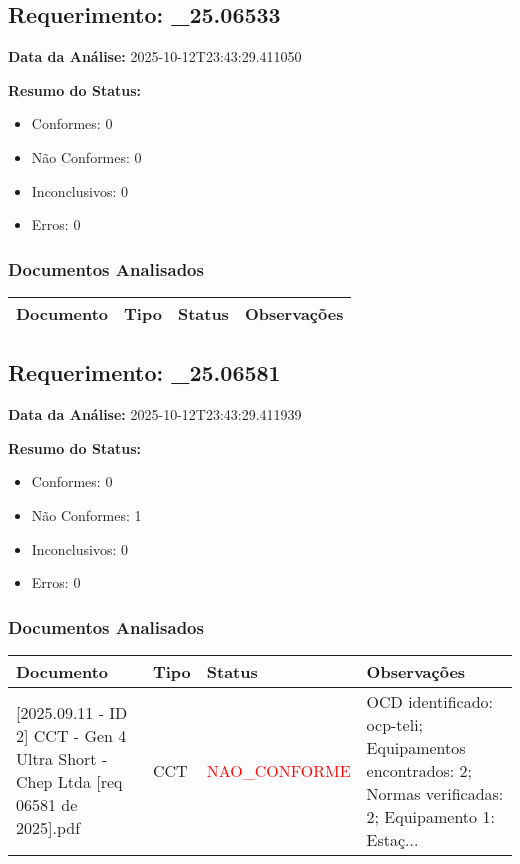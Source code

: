 \documentclass[12pt,a4paper]{article}
\begin{document}
\subsection{Requerimento: \_25.06533}

\textbf{Data da Análise:} 2025-10-12T23:43:29.411050

\textbf{Resumo do Status:}
\begin{itemize}
    \item Conformes: 0
    \item Não Conformes: 0
    \item Inconclusivos: 0
    \item Erros: 0
\end{itemize}

\subsubsection{Documentos Analisados}

\begin{longtable}{|p{4cm}|p{2cm}|p{2cm}|p{6cm}|}
\hline
\textbf{Documento} & \textbf{Tipo} & \textbf{Status} & \textbf{Observações} \\
\hline
\endhead
\end{longtable}


\subsection{Requerimento: \_25.06581}

\textbf{Data da Análise:} 2025-10-12T23:43:29.411939

\textbf{Resumo do Status:}
\begin{itemize}
    \item Conformes: 0
    \item Não Conformes: 1
    \item Inconclusivos: 0
    \item Erros: 0
\end{itemize}

\subsubsection{Documentos Analisados}

\begin{longtable}{|p{4cm}|p{2cm}|p{2cm}|p{6cm}|}
\hline
\textbf{Documento} & \textbf{Tipo} & \textbf{Status} & \textbf{Observações} \\
\hline
\endhead
[Certificado de Conformidade Técnica - CCT][2025.09.11 - ID 2] CCT - Gen 4 Ultra Short - Chep Ltda [req 06581 de 2025].pdf & CCT & \textcolor{red}{NAO\_CONFORME} & OCD identificado: ocp-teli; Equipamentos encontrados: 2; Normas verificadas: 2; Equipamento 1: Estaç... \\
\hline
\end{longtable}
\end{document}
